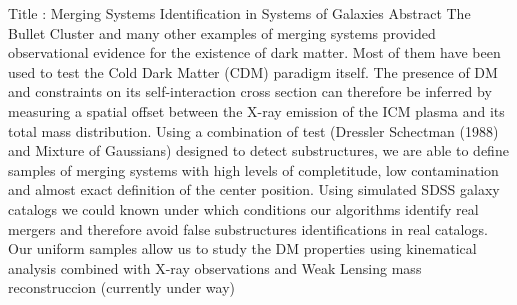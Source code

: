 Title : Merging Systems Identification in Systems of Galaxies
Abstract
The Bullet Cluster and many other examples of merging systems provided observational evidence for the existence of dark matter. Most of them have been used to test the Cold Dark Matter (CDM) paradigm itself. The presence of DM and constraints on its self-interaction cross section can therefore be inferred by measuring a spatial offset between the X-ray emission of the ICM plasma and its total mass distribution.
Using a combination of test (Dressler Schectman (1988) and Mixture of Gaussians) designed to detect substructures, we are able to define samples of merging systems with high levels of completitude, low contamination and almost exact definition of the center position. Using simulated SDSS galaxy catalogs we could known under which conditions our algorithms identify real mergers and therefore avoid false substructures identifications in real catalogs.
Our uniform samples allow us to study the DM properties using kinematical analysis combined with X-ray observations and Weak Lensing mass reconstruccion (currently under way)
